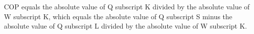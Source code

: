COP equals the absolute value of Q subscript K divided by the absolute value of W subscript K, which equals the absolute value of Q subscript S minus the absolute value of Q subscript L divided by the absolute value of W subscript K.
